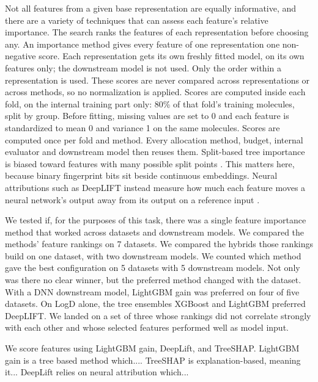 Not all features from a given base representation are equally informative, and there are a variety of techniques that can assess each feature's relative importance. The search ranks the features of each representation before choosing any. An importance method gives every feature of one representation one non-negative score. Each representation gets its own freshly fitted model, on its own features only; the downstream model is not used. Only the order within a representation is used. These scores are never compared across representations or across methods, so no normalization is applied. Scores are computed inside each fold, on the internal training part only: 80\% of that fold's training molecules, split by group. Before fitting, missing values are set to 0 and each feature is standardized to mean 0 and variance 1 on the same molecules. Scores are computed once per fold and method. Every allocation method, budget, internal evaluator and downstream model then reuses them. Split-based tree importance is biased toward features with many possible split points \citep{Strobl2007}. This matters here, because binary fingerprint bits sit beside continuous embeddings. Neural attributions such as DeepLIFT instead measure how much each feature moves a neural network's output away from its output on a reference input \citep{Ancona2018}.

We tested if, for the purposes of this task, there was a single feature importance method that worked across datasets and downstream models. We compared the methods' feature rankings on 7 datasets. We compared the hybrids those rankings build on one dataset, with two downstream models. We counted which method gave the best configuration on 5 datasets with 5 downstream models. Not only was there no clear winner, but the preferred method changed with the dataset. With a DNN downstream model, LightGBM gain was preferred on four of five datasets. On LogD alone, the tree ensembles XGBoost and LightGBM preferred DeepLIFT. We landed on a set of three whose rankings did not correlate strongly with each other and whose selected features performed well as model input.

We score features using LightGBM gain, DeepLift, and TreeSHAP. LightGBM gain is a tree based method which.... TreeSHAP is explanation-based, meaning it... DeepLift relies on neural attribution which...

